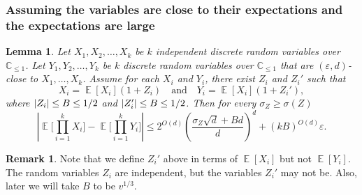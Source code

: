 \documentclass[11pt]{article}
\numberwithin{equation}{section}
\newtheorem{lemma}[theorem]{Lemma}
\theoremstyle{definition}
\newtheorem{remark}[theorem]{Remark}
\theoremstyle{plain}
\newcommand{\C}{\mathbb C}
\def\eps{\varepsilon}
\DeclarePairedDelimiter{\abs}{\lvert}{\rvert}
\DeclareMathOperator*{\E}{\mathbb{E}}                 %
\begin{document}
  \subsubsection{Assuming the variables are close to their expectations and the expectations are large}

  \begin{lemma} \label{lemma-GKM1}
    Let $X_1, X_2, \ldots, X_k$ be $k$ independent discrete random variables over $\C_{\le 1}$.
    Let $Y_1, Y_2, \ldots, Y_k$ be $k$ discrete random variables over $\C_{\le 1}$ that are $(\eps, d)$-close to $X_1, \ldots, X_k$.
    Assume for each $X_i$ and $Y_i$, there exist $Z_i$ and $Z_i'$ such that
    \[ X_i = \E[X_i] (1 + Z_i) \quad \text{and} \quad Y_i = \E[X_i] (1 + Z_i') , \]
    where $\abs{Z_i} \le B \le 1/2$ and $\abs{Z_i'} \le B \le 1/2$.
    Then for every $\sigma_Z \ge \sigma(Z)$
    \[
      \left| \E \Big[ \prod_{i = 1}^k X_i \Big] - \E \Big[ \prod_{i = 1}^k Y_i \Big] \right| 
      \le 2^{O(d)} \left( \frac{ \sigma_Z \sqrt{d} + B d }{d} \right)^d + (kB)^{O(d)} \eps .
    \]
  \end{lemma}
  \begin{remark}
    Note that we define $Z_i'$ above in terms of $\E[X_i]$ but not $\E[Y_i]$.
    The random variables $Z_i$ are independent, but the variables $Z_i'$ may not be.
    Also, later we will take $B$ to be $v^{1/3}$.
  \end{remark}
\end{document}
